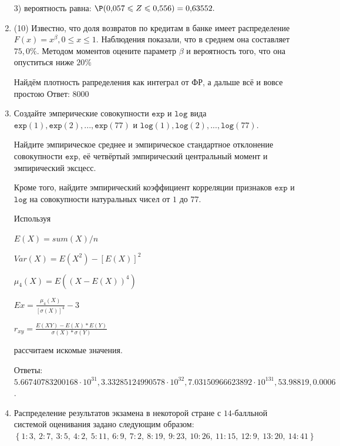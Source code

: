 \documentclass[a4paper,14pt]{article}
\begin{document}
\begin{enumerate}
3) вероятность равна:
$
\P(0,\!057\leqslant Z\leqslant 0,\!556)=
0,\!63552.
$


\item


(10) Известно, что доля возвратов по кредитам в банке имеет распределение $F(x) = x ^{\beta}, 0 \leqslant x \leqslant 1$.
Наблюдения показали, что в среднем она составляет $75,0\%$. Методом моментов оцените параметр $\beta$ и
вероятность того, что она опуститься ниже $20\%$




Найдём плотность рапределения как интеграл от ФР, а дальше всё и вовсе простою Ответ: $8000$


\item

    
    Создайте эмперические совокупности  $\mathtt{\text{exp}}$ и $\mathtt{\text{log}}$ вида $\mathtt{\text{exp}}(1),\mathtt{\text{exp}}(2), ..., \mathtt{\text{exp}}(77) $ и $\mathtt{\text{log}}(1),\mathtt{\text{log}}(2), ..., \mathtt{\text{log}}(77). $

    Найдите эмпирическое среднее и эмпирическое стандартное отклонение совокупности $\mathtt{\text{exp}}$, её четвёртый эмпирический центральный момент и эмпирический эксцесс.

    Кроме того, найдите эмпирический коэффициент корреляции признаков $\mathtt{\text{exp}}$ и $\mathtt{\text{log}}$ на совокупности натуральных чисел от $1$ до $77$.
    


    
    Используя

	$E(X) = sum(X) / n$

	$Var(X) = E(X^2) - [E(X)]^2$

	$\mu_4(X) = E((X-E(X))^4)$

	$Ex = \frac{\mu_4(X)}{[\sigma(X)]^4} - 3$

	$r_{xy} = \frac{E(XY) - E(X) * E(Y)}{\sigma(X) * \sigma(Y)}$

    рассчитаем искомые значения.

    Ответы: $5.66740783200168 \cdot 10^{31}, 3.33285124990578 \cdot 10^{32}, 7.03150966623892 \cdot 10^{131}, 53.98819, 0.0006$.

    

\item

    
    	Распределение результатов экзамена в некоторой стране с $14$-балльной системой оценивания задано следующим образом:
    	$\left\{ 1 : 3, \  2 : 7, \  3 : 5, \  4 : 2, \  5 : 11, \  6 : 9, \  7 : 2, \  8 : 19, \  9 : 23, \  10 : 26, \  11 : 15, \  12 : 9, \  13 : 20, \  14 : 41\right\}$


\end{enumerate}
\end{document}

